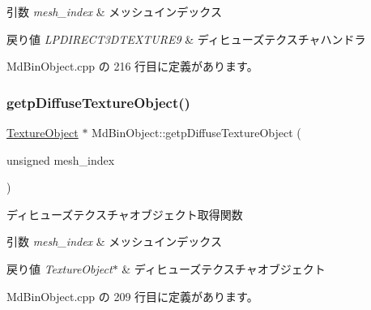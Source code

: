 \begin{DoxyParams}{引数}
{\em mesh\+\_\+index} & メッシュインデックス ~\newline
\\
\hline
\end{DoxyParams}

\begin{DoxyRetVals}{戻り値}
{\em L\+P\+D\+I\+R\+E\+C\+T3\+D\+T\+E\+X\+T\+U\+R\+E9} & ディヒューズテクスチャハンドラ \\
\hline
\end{DoxyRetVals}


 Md\+Bin\+Object.\+cpp の 216 行目に定義があります。

\mbox{\label{class_md_bin_object_a0d6c63cef9e65ec57a23a7e79eccf79d}} 
\subsubsection{\texorpdfstring{getp\+Diffuse\+Texture\+Object()}{getpDiffuseTextureObject()}}
{\footnotesize\ttfamily \mbox{\hyperlink{class_texture_object}{Texture\+Object}} $\ast$ Md\+Bin\+Object\+::getp\+Diffuse\+Texture\+Object (\begin{DoxyParamCaption}\item[{unsigned}]{mesh\+\_\+index }\end{DoxyParamCaption})}



ディヒューズテクスチャオブジェクト取得関数 


\begin{DoxyParams}{引数}
{\em mesh\+\_\+index} & メッシュインデックス \\
\hline
\end{DoxyParams}

\begin{DoxyRetVals}{戻り値}
{\em Texture\+Object$\ast$} & ディヒューズテクスチャオブジェクト \\
\hline
\end{DoxyRetVals}


 Md\+Bin\+Object.\+cpp の 209 行目に定義があります。

\mbox{\label{class_md_bin_object_af4e4d4d4678c14e42bfb578c46ed49bc}} 
